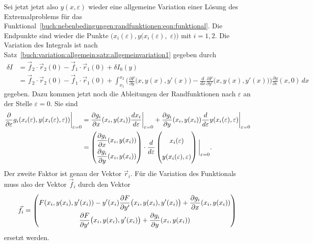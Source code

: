 Sei jetzt jetzt also $y(x,\varepsilon)$ wieder eine allgemeine Variation
einer Lösung des Extremalproblems für das
Funktional~\eqref{buch:nebenbedingungen:randfunktionen:eqn:funktional}.
Die Endpunkte sind wieder die Punkte
$(x_i(\varepsilon),y(x_i(\varepsilon),$ $\varepsilon))$ mit $i=1,2$.
Die Variation des Integrals ist nach
Satz~\ref{buch:variation:allgemein:satz:allgemeinvariation1} 
gegeben durch
\begin{align*}
\delta I
&=
\vec{f}_2\cdot \vec{r}_2(0) - \vec{f}_1\cdot\vec{r}_1(0)
+
\delta I_0(y)
\\
&=
\vec{f}_2\cdot \vec{r}_2(0) - \vec{f}_1\cdot\vec{r}_1(0)
+
\int_{x_1}^{x_2}
\biggl(
\frac{\partial F}{\partial y}\bigl(x,y(x),y'(x)\bigr)
-
\frac{d}{dx}\frac{\partial F}{\partial y'}\bigl(x,y(x),y'(x)\bigr)
\biggr)
\frac{\partial y}{\partial\varepsilon}(x,0)
\,dx
\end{align*}
gegeben.
Dazu kommen jetzt noch die Ableitungen der Randfunktionen nach
$\varepsilon$ an der Stelle $\varepsilon=0$.
Sie sind
\begin{align*}
\frac{\partial}{\partial\varepsilon}
g_i(x_i(\varepsilon),y(x_i(\varepsilon),\varepsilon))
\bigg|_{\varepsilon=0}
&=
\frac{\partial g_i}{\partial x}(x_i,y(x_i))
\frac{d x_i}{d\varepsilon}\bigg|_{\varepsilon=0}
+
\frac{\partial g_i}{\partial y}(x_i,y(x_i))
\frac{d}{d\varepsilon}y(x_i(\varepsilon),\varepsilon)
\bigg|_{\varepsilon=0}
\\
&=
\bgroup
\renewcommand\arraystretch{2}
\begin{pmatrix}
\displaystyle
\frac{\partial g_i}{\partial x}(x_i,y(x_i))
\\
\displaystyle
\frac{\partial g_i}{\partial y}(x_i,y(x_i))
\end{pmatrix}
\egroup
\cdot
\frac{d}{d\varepsilon}
\begin{pmatrix}
x_i(\varepsilon)\\
y(x_i(\varepsilon),\varepsilon)
\end{pmatrix}
\bigg|_{\varepsilon=0}.
\end{align*}
Der zweite Faktor ist genau der Vektor $\vec{r}_i$. 
Für die Variation des Funktionals muss also der Vektor $\vec{f}_i$ durch
den Vektor
\begin{equation}
\vec{f}_i
=
\renewcommand\arraystretch{2}
\begin{pmatrix}
\displaystyle
F(x_i,y(x_i),y'(x_i))
-
y'(x_i) \frac{\partial F}{\partial y'}\bigl(x_i,y(x_i),y'(x_i)\bigr)
+
\frac{\partial g_i}{\partial x}(x_i,y(x_i))
\\
\displaystyle
\frac{\partial F}{\partial y'}\bigl(x_i,y(x_i),y'(x_i)\bigr)
+
\frac{\partial g_i}{\partial y}(x_i,y(x_i))
\end{pmatrix}
\label{buch:nebenbedingungen:randfunktionen:eqn:fnew}
\end{equation}
ersetzt werden.

